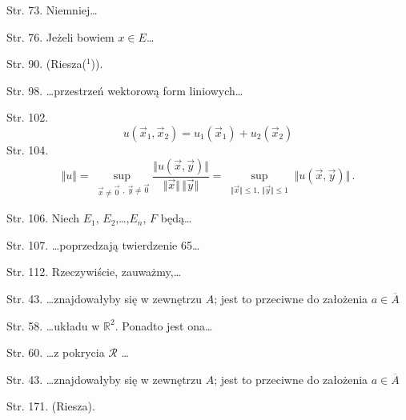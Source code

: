 \documentclass[a4paper,11pt]{article}
\begin{document}
\start Str. 73. Niemniej\ldots

\start Str. 76. Jeżeli bowiem $x \in E$\ldots

\start Str. 90. \large{(Riesza($^{ 1 }$))}.

\start Str. 98. \ldots przestrzeń wektorową form liniowych\ldots

\start Str. 102.
$$u(\vec{x}_{1},\vec{x}_{2})=u_{1}(\vec{x}_{1})+u_{2}(\vec{x}_{2})$$
\start Str. 104.
$$\Vert u \Vert = \sup_{ \substack{ \vec{ x } \neq \vec{ 0 } },
  \,\vec{ y } \neq \vec{ 0 } } \frac{ \Vert u( \vec x, \vec y ) \Vert
}{ \Vert \vec{ x } \Vert \, \Vert \vec y \Vert } = \sup_{ \substack{
    \Vert \vec{ x } \Vert \leq 1, \, \Vert \vec{ y } \Vert \leq 1 } }
\Vert u( \vec x, \vec y ) \Vert \, .$$

\start Str. 106. Niech $E_{ 1 }$, $E_{ 2 }$,\ldots,$E_{ n }$, $F$
będą\ldots

\start Str. 107. \ldots poprzedzają twierdzenie 65\ldots

\start Str. 112. Rzeczywiście, zauważmy,\ldots

\start Str. 43. \ldots znajdowałyby się w zewnętrzu $A$; jest to
przeciwne do założenia $a \in \overline{ A }$

\start Str. 58. \ldots układu w $\mathbb{R}^{ 2 }$. Ponadto jest
ona\ldots

\start Str. 60. \ldots z pokrycia $\mathcal{R}$ \ldots

\start Str. 43. \ldots znajdowałyby się w zewnętrzu $A$; jest to
przeciwne do założenia $a \in \overline{ A }$


\start Str. 171. \large{(Riesza)}.





\newpage
{}



\end{document}
